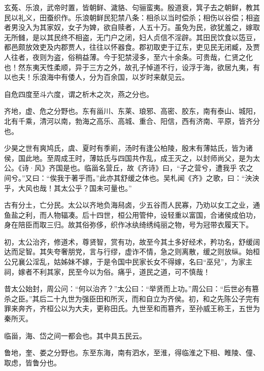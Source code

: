 \documentclass[12pt,UTF8]{ctexbook}
\begin{document}
玄菟、乐浪，武帝时置，皆朝鲜、濊貉、句骊蛮夷。殷道衰，箕子去之朝鲜，教其民以礼义，田蚕织作。乐浪朝鲜民犯禁八条：相杀以当时偿杀；相伤以谷偿；相盗者男没入为其家奴，女子为婢，欲自赎者，人五十万。虽免为民，欲犹羞之，嫁取无所雠，是以其民终不相盗，无门户之闭，妇人贞信不淫辟。其田民饮食以笾豆，都邑颇放效吏及内郡贾人，往往以怀器食。郡初取吏于辽东，吏见民无闭臧，及贾人往者，夜则为盗，俗稍益薄。今于犯禁浸多，至六十余条。可贵哉，仁贤之化也！然东夷天性柔顺，异于三方之外，故孔子悼道不行，设浮于海，欲居九夷，有以也夫！乐浪海中有倭人，分为百余国，以岁时来献见云。



自危四度至斗六度，谓之析木之次，燕之分也。



齐地，虚、危之分野也。东有甾川、东莱、琅邪、高密、胶东，南有泰山、城阳，北有千乘，清河以南，勃海之高乐、高城、重合、阳信，西有济南、平原，皆齐分也。



少昊之世有爽鸠氏，虞、夏时有季崱，汤时有逢公柏陵，殷末有薄姑氏，皆为诸侯，国此地。至周成王时，薄姑氏与四国共作乱，成王灭之，以封师尚父，是为太公。《诗·风》齐国是也。临甾名营丘，故《齐诗》曰，“子之营兮，遭我乎农之间兮。”又曰：“俟我于著乎而。”此亦其舒缓之体也。吴札闻《齐》之歌，曰：“泱泱乎，大风也哉！其太公乎？国未可量也。”



古有分土，亡分民。太公以齐地负海舄卤，少五谷而人民寡，乃劝以女工之业，通鱼盐之利，而人物辐凑。后十四世，桓公用管仲，设轻重以富国，合诸侯成伯功，身在陪臣而取三归。故其俗弥侈，织作冰纨绮绣纯丽之物，号为冠带衣履天下。



初，太公治齐，修道术，尊贤智，赏有功，故至今其土多好经术，矜功名，舒缓阔达而足智。其失夸奢朋党，言与行缪，虚诈不情，急之则离散，缓之则放纵。始桓公兄襄公淫乱，姑姊妹不嫁，于是令国中民家长女不得嫁，名曰“巫兒”，为家主祠，嫁者不利其家，民至今以为俗。痛乎，道民之道，可不慎哉！



昔太公始封，周公问：“何以治齐？”太公曰：“举贤而上功。”周公曰：“后世必有篡杀之臣。”其后二十九世为强臣田和所灭，而和自立为齐侯。初，和之先陈公子完有罪来奔齐，齐桓公以为大夫，更称田氏。九世至和而篡齐，至孙威王称王，五世为秦所灭。



临甾，海、岱之间一都会也。其中具五民云。



鲁地，奎、娄之分野也。东至东海，南有泗水，至淮，得临淮之下相、睢陵、僮、取虑，皆鲁分也。
\end{document}
